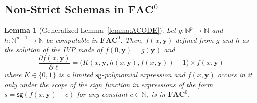 \documentclass[11pt, oneside]{article}
\newenvironment{toappendix}{}{}
\newcommand{\fun}[1]{\mathsf{#1}}
\newcommand{\Nat}{\mathbb{N}}
\newcommand{\AC}{\mathbf{FAC}}
\newcommand{\tu}[1]{\mathbf{#1}}
\newtheorem{lemma}{Lemma}
\theoremstyle{definition}
\begin{document}
\begin{toappendix}
\subsection{Non-Strict Schemas in $\AC^0$}\label{appendix:strictAC0}
%
%


\begin{lemma}[Generalized Lemma~\ref{lemma:ACODE}]\label{lemma:ACODEg}
    Let $g:\Nat^p\to \Nat$ and $h:\Nat^{p+1} \to \Nat$ be computable in $\AC^0$.
    Then, $f(x, \tu y)$ defined from $g$ and $h$ as the solution of the IVP made of $f(0, \tu y)=g(\tu y)$ and 
    $$
        \frac{\partial f(x, \tu y)}{\partial \ell} = \big(K(x, \tu y, h(x, \tu y), f(x, \tu y))-1\big) \times f(x, \tu y)
    $$
    where $K\in \{0,1\}$ is a limited $\fun{sg}$-polynomial expression and $f(x, \tu y)$ occurs in it only under the scope of the sign function in expressions of the form $s=\fun{sg}(f(x, \tu y)-c)$ for any constant $c\in \Nat$, is in $\AC^0$.
\end{lemma}


\end{toappendix}
\end{document}
